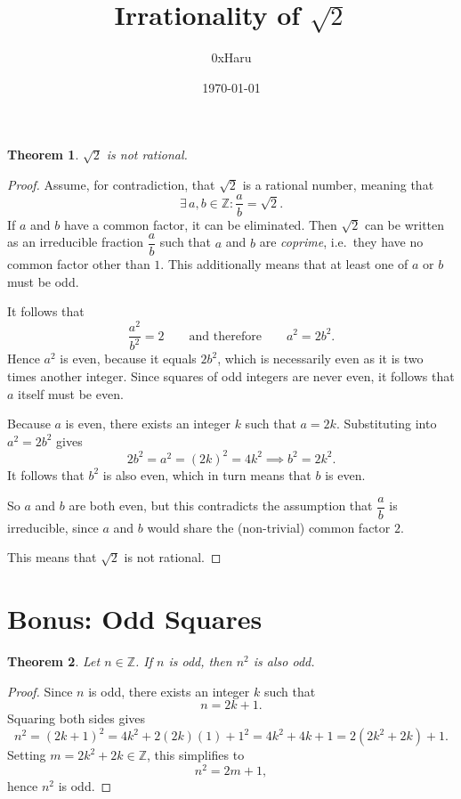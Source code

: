 \documentclass[12pt, a4paper]{article}
\title{\textbf{Irrationality of $\sqrt{2}$}}
\author{0xHaru}
\date{\today}
\newtheorem{theorem}{Theorem}
\begin{document}
\maketitle

\begin{theorem}
    $\sqrt{2}$ is not rational.
\end{theorem}

\begin{proof}
Assume, for contradiction, that $\sqrt{2}$ is a rational number, meaning that
\[
    \exists\, a, b \in \mathbb{Z} : \frac{a}{b} = \sqrt{2}.
\]
If $a$ and $b$ have a common factor, it can be eliminated. Then $\sqrt{2}$ can be
written as an irreducible fraction $\dfrac{a}{b}$ such that $a$ and $b$ are
\emph{coprime}, i.e.\ they have no common factor other than $1$. This additionally
means that at least one of $a$ or $b$ must be odd.

It follows that
\[
    \frac{a^{2}}{b^{2}} = 2 \qquad \text{and therefore} \qquad a^{2} = 2b^{2}.
\]
Hence $a^{2}$ is even, because it equals $2b^{2}$, which is necessarily even as it
is two times another integer. Since squares of odd integers are never even, it
follows that $a$ itself must be even.

Because $a$ is even, there exists an integer $k$ such that $a = 2k$. Substituting
into $a^{2} = 2b^{2}$ gives
\[
    2b^{2} = a^{2} = (2k)^{2} = 4k^{2} \implies b^{2} = 2k^{2}.
\]
It follows that $b^{2}$ is also even, which in turn means that $b$ is even.

\medskip

So $a$ and $b$ are both even, but this contradicts the assumption that
$\dfrac{a}{b}$ is irreducible, since $a$ and $b$ would share the (non-trivial) common factor $2$.

\medskip

This means that $\sqrt{2}$ is not rational.
\end{proof}

\newpage

\section*{Bonus: Odd Squares}

\begin{theorem}
    Let $n \in \mathbb{Z}$. If $n$ is odd, then $n^{2}$ is also odd.
\end{theorem}

\begin{proof}
Since $n$ is odd, there exists an integer $k$ such that
\[
    n = 2k + 1.
\]
Squaring both sides gives
\[
    n^{2} = (2k+1)^{2} = 4k^{2} + 2(2k)(1) + 1^{2} = 4k^{2} + 4k + 1 = 2\!\left(2k^{2} + 2k\right) + 1.
\]
Setting $m = 2k^{2} + 2k \in \mathbb{Z}$, this simplifies to
\[
    n^{2} = 2m + 1,
\]
hence $n^{2}$ is odd.
\end{proof}
\end{document}
